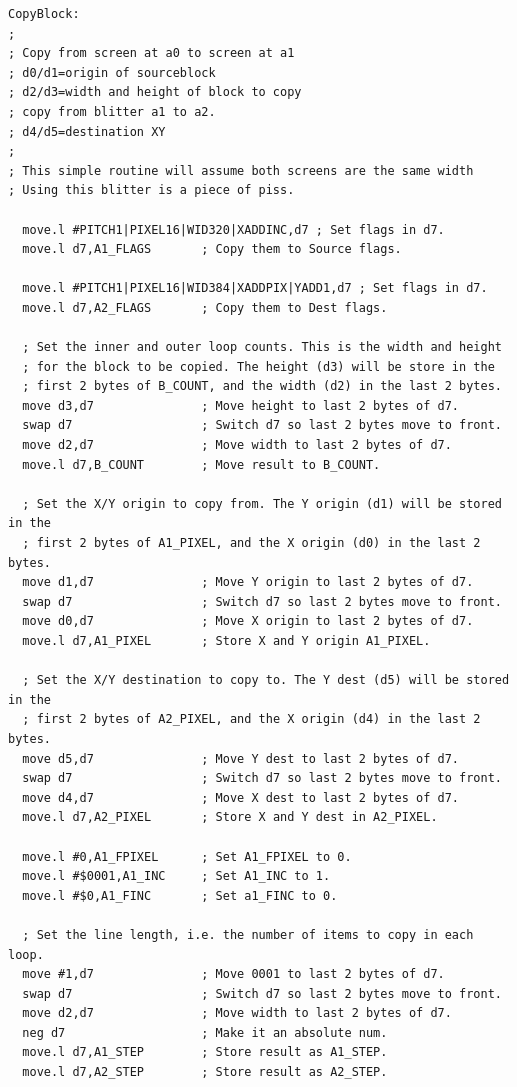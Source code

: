 \clearpage
\begin{lstlisting}[escapechar=\%]
CopyBlock:
;
; Copy from screen at a0 to screen at a1
; d0/d1=origin of sourceblock
; d2/d3=width and height of block to copy
; copy from blitter a1 to a2.
; d4/d5=destination XY
;
; This simple routine will assume both screens are the same width
; Using this blitter is a piece of piss.

  move.l #PITCH1|PIXEL16|WID320|XADDINC,d7 ; Set flags in d7.
  move.l d7,A1_FLAGS       ; Copy them to Source flags.

  move.l #PITCH1|PIXEL16|WID384|XADDPIX|YADD1,d7 ; Set flags in d7.
  move.l d7,A2_FLAGS       ; Copy them to Dest flags.

  ; Set the inner and outer loop counts. This is the width and height
  ; for the block to be copied. The height (d3) will be store in the
  ; first 2 bytes of B_COUNT, and the width (d2) in the last 2 bytes.
  move d3,d7               ; Move height to last 2 bytes of d7.
  swap d7                  ; Switch d7 so last 2 bytes move to front.
  move d2,d7               ; Move width to last 2 bytes of d7.
  move.l d7,B_COUNT        ; Move result to B_COUNT.

  ; Set the X/Y origin to copy from. The Y origin (d1) will be stored in the
  ; first 2 bytes of A1_PIXEL, and the X origin (d0) in the last 2 bytes.
  move d1,d7               ; Move Y origin to last 2 bytes of d7.
  swap d7                  ; Switch d7 so last 2 bytes move to front.
  move d0,d7               ; Move X origin to last 2 bytes of d7.
  move.l d7,A1_PIXEL       ; Store X and Y origin A1_PIXEL.

  ; Set the X/Y destination to copy to. The Y dest (d5) will be stored in the
  ; first 2 bytes of A2_PIXEL, and the X origin (d4) in the last 2 bytes.
  move d5,d7               ; Move Y dest to last 2 bytes of d7.     
  swap d7                  ; Switch d7 so last 2 bytes move to front.
  move d4,d7               ; Move X dest to last 2 bytes of d7.
  move.l d7,A2_PIXEL       ; Store X and Y dest in A2_PIXEL.

  move.l #0,A1_FPIXEL      ; Set A1_FPIXEL to 0.
  move.l #$0001,A1_INC     ; Set A1_INC to 1.
  move.l #$0,A1_FINC       ; Set a1_FINC to 0.

  ; Set the line length, i.e. the number of items to copy in each loop.
  move #1,d7               ; Move 0001 to last 2 bytes of d7.
  swap d7                  ; Switch d7 so last 2 bytes move to front.
  move d2,d7               ; Move width to last 2 bytes of d7.
  neg d7                   ; Make it an absolute num. 
  move.l d7,A1_STEP        ; Store result as A1_STEP.
  move.l d7,A2_STEP        ; Store result as A2_STEP.

\end{lstlisting}
